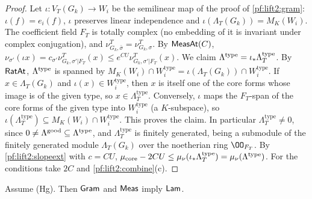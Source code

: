 \begin{proof}
Let $\iota\colon V_T(G_k)\to W_i$ be the semilinear map of the proof of \cref{pf:lift2:gram}: $\iota(f)=e_i(f)$, $\iota$
preserves linear independence and $\iota(\Lambda_T(G_k))=M_K(W_i)$. The coefficient field $F_T$ is totally complex (no
embedding of it is invariant under complex conjugation), and $\nu^T_{G_k,\bar\sigma}=\nu^T_{G_k,\sigma}$. By
$\mathsf{MeasAt}(C)$, $\nu_{\sigma'}(\iota x)=c_{\sigma'}\nu^T_{G_k,\sigma'|F_T}(x)\le e^{CU}\nu^T_{G_k,\sigma'|F_T}(x)$. We
claim $\Lambda^{\mathrm{type}}=\iota_*\Lambda^{\mathrm{type}}_T$. By $\mathsf{RatAt}$, $\Lambda^{\mathrm{type}}$ is spanned by
$M_K(W_i)\cap W_i^{\mathrm{type}}=\iota(\Lambda_T(G_k))\cap W_i^{\mathrm{type}}$. If $x\in\Lambda_T(G_k)$ and
$\iota(x)\in W_i^{\mathrm{type}}$, then $x$ is itself one of the core forms whose image is of the given type, so
$x\in\Lambda^{\mathrm{type}}_T$. Conversely, $\iota$ maps the $F_T$-span of the core forms of the given type into
$W_i^{\mathrm{type}}$ (a $K$-subspace), so $\iota(\Lambda^{\mathrm{type}}_T)\subseteq M_K(W_i)\cap
W_i^{\mathrm{type}}$. This proves the claim. In particular $\Lambda^{\mathrm{type}}_T\ne0$, since
$0\ne\Lambda^{\mathrm{good}}\subseteq\Lambda^{\mathrm{type}}$, and $\Lambda^{\mathrm{type}}_T$ is finitely generated, being a
submodule of the finitely generated module $\Lambda_T(G_k)$ over the noetherian ring $\OO_{F_T}$. By
\cref{pf:lift2:slopeext} with $c=CU$,
$\mu_{\mathrm{core}}-2CU\le\mu_\nu(\iota_*\Lambda^{\mathrm{type}}_T)=\mu_\nu(\Lambda^{\mathrm{type}})$. For the conditions take
$2C$ and \cref{pf:lift2:combine}(c).
\end{proof}

\begin{proposition}\label{pf:lift2:lam}
Assume \textup{(Hg)}. Then $\mathsf{Gram}$ and $\mathsf{Meas}$ imply $\mathsf{Lam}$.
\end{proposition}

